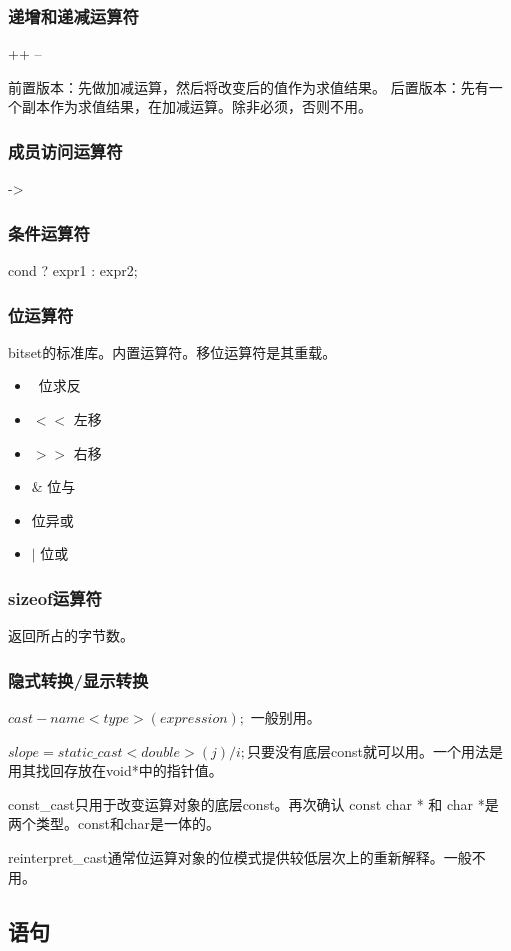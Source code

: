 \subsubsection{递增和递减运算符}
++ --

前置版本：先做加减运算，然后将改变后的值作为求值结果。
后置版本：先有一个副本作为求值结果，在加减运算。除非必须，否则不用。

\subsubsection{成员访问运算符}
->
\subsubsection{条件运算符}
cond ? expr1 : expr2;

\subsubsection{位运算符}
bitset的标准库。内置运算符。移位运算符是其重载。
\begin{itemize}
	\item ~位求反
	\item $<<$ 左移
	\item $>>$ 右移
	\item \& 位与
	\item 位异或
	\item $|$ 位或
\end{itemize}

\subsubsection{sizeof运算符}
返回所占的字节数。

\subsubsection{隐式转换/显示转换}
$cast-name<type>(expression);$ 一般别用。

$ slope = static\_cast<double>(j) / i;$只要没有底层const就可以用。一个用法是用其找回存放在void*中的指针值。

const\_cast只用于改变运算对象的底层const。再次确认 const char * 和 char *是两个类型。const和char是一体的。

reinterpret\_cast通常位运算对象的位模式提供较低层次上的重新解释。一般不用。

\subsection{语句}

